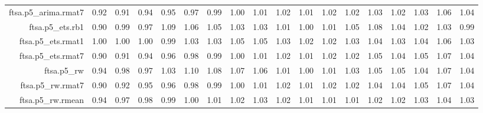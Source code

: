 \begin{tabular}{rrrrrrrrrrrrrrrrrr}
  ftsa.p5\_arima.rmat7 & 0.92 & 0.91 & 0.94 & 0.95 & 0.97 & 0.99 & 1.00 & 1.01 & 1.02 & 1.01 & 1.02 & 1.02 & 1.03 & 1.02 & 1.03 & 1.06 & 1.04 \\ 
  ftsa.p5\_ets.rb1 & 0.90 & 0.99 & 0.97 & 1.09 & 1.06 & 1.05 & 1.03 & 1.03 & 1.01 & 1.00 & 1.01 & 1.05 & 1.08 & 1.04 & 1.02 & 1.03 & 0.99 \\ 
  ftsa.p5\_ets.rmat1 & 1.00 & 1.00 & 1.00 & 0.99 & 1.03 & 1.03 & 1.05 & 1.05 & 1.03 & 1.02 & 1.02 & 1.03 & 1.04 & 1.03 & 1.04 & 1.06 & 1.03 \\ 
  ftsa.p5\_ets.rmat7 & 0.90 & 0.91 & 0.94 & 0.96 & 0.98 & 0.99 & 1.00 & 1.01 & 1.02 & 1.01 & 1.02 & 1.02 & 1.05 & 1.04 & 1.05 & 1.07 & 1.04 \\ 
  ftsa.p5\_rw & 0.94 & 0.98 & 0.97 & 1.03 & 1.10 & 1.08 & 1.07 & 1.06 & 1.01 & 1.00 & 1.01 & 1.03 & 1.05 & 1.05 & 1.04 & 1.07 & 1.04 \\ 
  ftsa.p5\_rw.rmat7 & 0.90 & 0.92 & 0.95 & 0.96 & 0.98 & 0.99 & 1.00 & 1.01 & 1.02 & 1.01 & 1.02 & 1.02 & 1.04 & 1.04 & 1.05 & 1.07 & 1.04 \\ 
  ftsa.p5\_rw.rmean & 0.94 & 0.97 & 0.98 & 0.99 & 1.00 & 1.01 & 1.02 & 1.03 & 1.02 & 1.01 & 1.01 & 1.01 & 1.02 & 1.02 & 1.03 & 1.04 & 1.03 \\ 
   \hline
\end{tabular}

